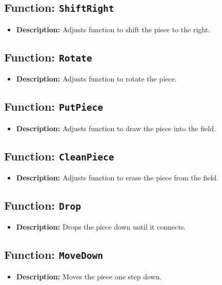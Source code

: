 \documentclass{article}
\begin{document}
\subsection{Function: \texttt{ShiftRight}}
\begin{itemize}
    \item \textbf{Description:} Adjusts function to shift the piece to the right.
\end{itemize}

\subsection{Function: \texttt{Rotate}}
\begin{itemize}
    \item \textbf{Description:} Adjusts function to rotate the piece.
\end{itemize}

\subsection{Function: \texttt{PutPiece}}
\begin{itemize}
    \item \textbf{Description:} Adjusts function to draw the piece into the field.
\end{itemize}

\subsection{Function: \texttt{CleanPiece}}
\begin{itemize}
    \item \textbf{Description:} Adjusts function to erase the piece from the field.
\end{itemize}

\subsection{Function: \texttt{Drop}}
\begin{itemize}
    \item \textbf{Description:} Drops the piece down until it connects.
\end{itemize}

\subsection{Function: \texttt{MoveDown}}
\begin{itemize}
    \item \textbf{Description:} Moves the piece one step down.
\end{itemize}
\end{document}
